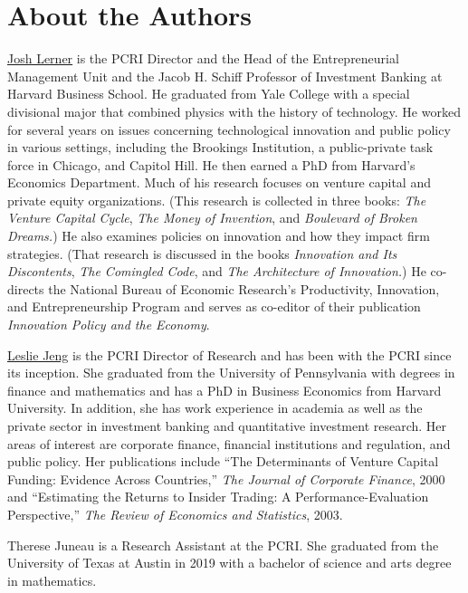 \hypertarget{about-the-authors-4}{%
\section*{About the Authors}\label{about-the-authors-4}}

\href{https://www.hbs.edu/faculty/Pages/profile.aspx?facId=9961}{Josh Lerner} is the PCRI Director and the Head of the Entrepreneurial Management Unit and the Jacob H. Schiff Professor of Investment Banking at Harvard Business School. He graduated from Yale College with a special divisional major that combined physics with the history of technology. He worked for several years on issues concerning technological innovation and public policy in various settings, including the Brookings Institution, a public-private task force in Chicago, and Capitol Hill. He then earned a PhD from Harvard's Economics Department. Much of his research focuses on venture capital and private equity organizations. (This research is collected in three books: \emph{The Venture Capital Cycle}, \emph{The Money of Invention}, and \emph{Boulevard of Broken Dreams.}) He also examines policies on innovation and how they impact firm strategies. (That research is discussed in the books \emph{Innovation and Its Discontents}, \emph{The Comingled Code}, and \emph{The Architecture of Innovation.}) He co-directs the National Bureau of Economic Research's Productivity, Innovation, and Entrepreneurship Program and serves as co-editor of their publication \emph{Innovation Policy and the Economy}.

\href{http://www.privatecapitalresearchinstitute.org/people.php}{Leslie Jeng} is the PCRI Director of Research and has been with the PCRI since its inception. She graduated from the University of Pennsylvania with degrees in finance and mathematics and has a PhD in Business Economics from Harvard University. In addition, she has work experience in academia as well as the private sector in investment banking and quantitative investment research. Her areas of interest are corporate finance, financial institutions and regulation, and public policy. Her publications include ``The Determinants of Venture Capital Funding: Evidence Across Countries,'' \emph{The Journal of Corporate Finance}, 2000 and ``Estimating the Returns to Insider Trading: A Performance-Evaluation Perspective,'' \emph{The Review of Economics and Statistics}, 2003.

Therese Juneau is a Research Assistant at the PCRI. She graduated from the University of Texas at Austin in 2019 with a bachelor of science and arts degree in mathematics.


